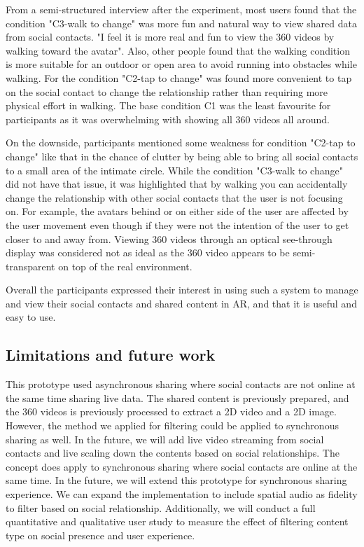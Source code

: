 From a semi-structured interview after the experiment, most users found that the condition "C3-walk to change" was more fun and natural way to view shared data from social contacts. "I feel it is more real and fun to view the 360 videos by walking toward the avatar". Also, other people found that the walking condition is more suitable for an outdoor or open area to avoid running into obstacles while walking. For the condition "C2-tap to change" was found more convenient to tap on the social contact to change the relationship rather than requiring more physical effort in walking. The base condition C1 was the least favourite for participants as it was overwhelming with showing all 360 videos all around. 

On the downside, participants mentioned some weakness for condition "C2-tap to change" like that in the chance of clutter by being able to bring all social contacts to a small area of the intimate circle. While the condition "C3-walk to change" did not have that issue, it was highlighted that by walking you can accidentally change the relationship with other social contacts that the user is not focusing on. For example, the avatars behind or on either side of the user are affected by the user movement even though if they were not the intention of the user to get closer to and away from.
Viewing 360 videos through an optical see-through display was considered not as ideal as the 360 video appears to be semi-transparent on top of the real environment.

Overall the participants expressed their interest in using such a system to manage and view their social contacts and shared content in AR, and that it is useful and easy to use. 

\subsection{Limitations and future work}

This prototype used asynchronous sharing where social contacts are not online at the same time sharing live data. The shared content is previously prepared, and the 360 videos is previously processed to extract a 2D video and a 2D image. However, the method we applied for filtering could be applied to synchronous sharing as well. In the future, we will add live video streaming from social contacts and live scaling down the contents based on social relationships. 
The concept does apply to synchronous sharing where social contacts are online at the same time. In the future, we will extend this prototype for synchronous sharing experience. We can expand the implementation to include spatial audio as fidelity to filter based on social relationship. 
Additionally, we will conduct a full quantitative and qualitative user study to measure the effect of filtering content type on social presence and user experience. 

